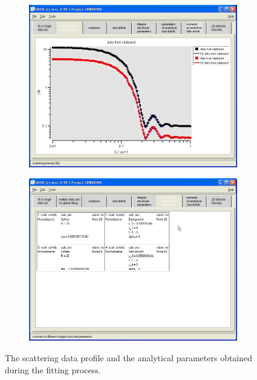 \begin{figure}[htb]
\begin{subfigure}[b]{.48\textwidth}
   \includegraphics[width=\textwidth]{QTmultiplefitUI7.png}
   \label{fig:QTmultiplefitUI7}
\end{subfigure}
\hfill
\begin{subfigure}[b]{.48\textwidth}
   \centering
   \includegraphics[width=\textwidth]{QTmultiplefitUI8.png}
   \label{fig:QTmultiplefitUI8}
\end{subfigure}
\caption{The scattering data profile and the analytical parameters obtained during the fitting process.}
\label{fig:QTmultiplefitUIeg}
\end{figure}
